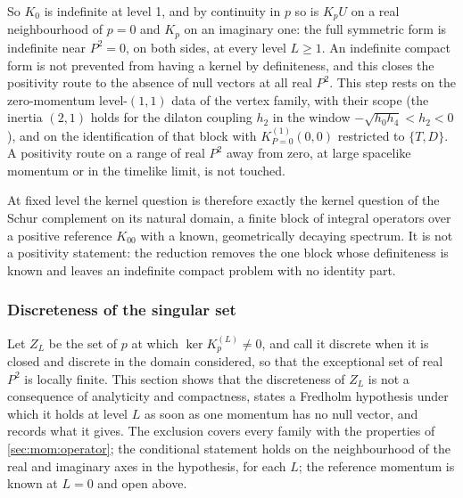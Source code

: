 So $K_0$ is indefinite at level 1, and by continuity in $p$ so is $K_p U$ on a real neighbourhood of $p = 0$ and $K_p$ on an imaginary one: the full symmetric form is indefinite near $P^2 = 0$, on both sides, at every level $L \ge 1$.
An indefinite compact form is not prevented from having a kernel by definiteness, and this closes the positivity route to the absence of null vectors at all real $P^2$.
This step rests on the zero-momentum level-$(1, 1)$ data of the vertex family, with their scope (the inertia $(2, 1)$ holds for the dilaton coupling $h_2$ in the window $- \sqrt{h_0 h_4} < h_2 < 0$), and on the identification of that block with $K^{(1)}_{P = 0}(0, 0)$ restricted to $\{T, D\}$.
A positivity route on a range of real $P^2$ away from zero, at large spacelike momentum or in the timelike limit, is not touched.

At fixed level the kernel question is therefore exactly the kernel question of the Schur complement on its natural domain, a finite block of integral operators over a positive reference $K_{00}$ with a known, geometrically decaying spectrum.
It is not a positivity statement: the reduction removes the one block whose definiteness is known and leaves an indefinite compact problem with no identity part.

\subsubsection{Discreteness of the singular set}
\label{sec:mom:discreteness}


Let $Z_L$ be the set of $p$ at which $\ker K^{(L)}_p \ne 0$, and call it discrete when it is closed and discrete in the domain considered, so that the exceptional set of real $P^2$ is locally finite.
This section shows that the discreteness of $Z_L$ is not a consequence of analyticity and compactness, states a Fredholm hypothesis under which it holds at level $L$ as soon as one momentum has no null vector, and records what it gives.
The exclusion covers every family with the properties of \cref{sec:mom:operator}; the conditional statement holds on the neighbourhood of the real and imaginary axes in the hypothesis, for each $L$; the reference momentum is known at $L = 0$ and open above.

